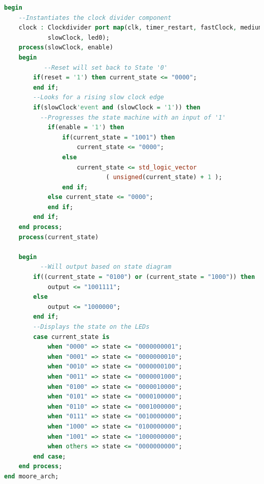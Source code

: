 \documentclass[11pt]{article}
\begin{document}
\begin{appendices}
\begin{lstlisting}[language=VHDL]
begin  
	--Instantiates the clock divider component
    clock : Clockdivider port map(clk, timer_restart, fastClock, mediumClock, 
    		slowClock, led0);
    process(slowClock, enable)
    begin
    	   --Reset will set back to State '0'
        if(reset = '1') then current_state <= "0000";
        end if;
        --Looks for a rising slow clock edge
        if(slowClock'event and (slowClock = '1')) then
		  --Progresses the state machine with an input of '1'           
            if(enable = '1') then
                if(current_state = "1001") then
                    current_state <= "0000";
                else
                    current_state <= std_logic_vector
                    		( unsigned(current_state) + 1 );
                end if;
            else current_state <= "0000";
            end if;
        end if;
    end process;
    process(current_state)
    	
    begin
    	  --Will output based on state diagram
        if((current_state = "0100") or (current_state = "1000")) then
            output <= "1001111";
        else
            output <= "1000000";
        end if;
        --Displays the state on the LEDs 
        case current_state is
            when "0000" => state <= "0000000001";
            when "0001" => state <= "0000000010";
            when "0010" => state <= "0000000100";
            when "0011" => state <= "0000001000";
            when "0100" => state <= "0000010000";
            when "0101" => state <= "0000100000";
            when "0110" => state <= "0001000000";
            when "0111" => state <= "0010000000";
            when "1000" => state <= "0100000000";
            when "1001" => state <= "1000000000";
            when others => state <= "0000000000";
        end case;
    end process;
end moore_arch;

\end{lstlisting}


\end{appendices}
\end{document}

